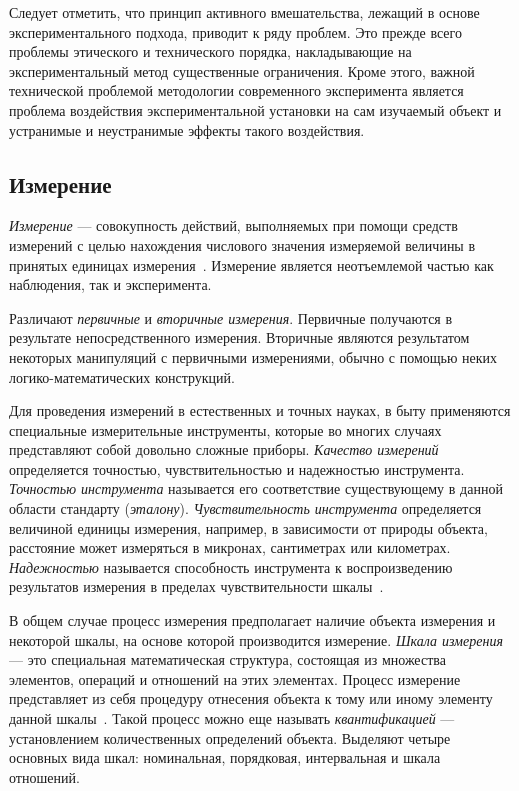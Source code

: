 Следует отметить, что принцип активного вмешательства, лежащий в основе экспериментального
подхода, приводит к ряду проблем. Это прежде всего
проблемы этического и технического порядка, накладывающие на
экспериментальный метод существенные ограничения.
Кроме этого, важной технической проблемой методологии современного эксперимента является
проблема воздействия экспериментальной установки на
сам изучаемый объект и устранимые и неустранимые эффекты такого воздействия.

\pagebreak

\subsection{Измерение}

\emph{Измерение} --- совокупность действий, выполняемых при помощи средств измерений
с целью нахождения числового значения измеряемой величины в принятых единицах
измерения~\cite{nekrasov2010}.
Измерение является неотъемлемой частью как наблюдения, так и эксперимента.

Различают \emph{первичные} и \emph{вторичные измерения}.
Первичные получаются в результате непосредственного измерения.
Вторичные являются результатом некоторых манипуляций с первичными измерениями,
обычно с помощью неких логико-математических конструкций.

Для проведения измерений в естественных и точных науках,
в быту применяются специальные измерительные инструменты,
которые во многих случаях представляют собой довольно сложные приборы.
\emph{Качество измерений} определяется точностью, чувствительностью и надежностью инструмента.
\emph{Точностью инструмента} называется его соответствие существующему в данной области
стандарту (\emph{эталону}).
\emph{Чувствительность инструмента} определяется величиной единицы измерения,
например, в зависимости от природы объекта, расстояние может измеряться в микронах,
сантиметрах или километрах.
\emph{Надежностью} называется способность инструмента к воспроизведению результатов измерения
в пределах чувствительности шкалы~\cite{gritsanov2003}.

В общем случае процесс измерения предполагает наличие объекта измерения и некоторой шкалы,
на основе которой производится измерение.
\textit{Шкала измерения} --- это специальная математическая структура, состоящая из множества элементов,
операций и отношений на этих элементах.
Процесс измерение представляет из себя процедуру отнесения объекта к тому или иному элементу
данной шкалы~\cite{moiseev2004}.
Такой процесс можно еще называть \emph{квантификацией} --- установлением количественных
определений объекта.
Выделяют четыре основных вида шкал: номинальная, порядковая, интервальная и шкала отношений.

